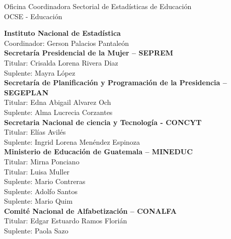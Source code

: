\cleardoublepage
$\ $
\vspace{-0.3cm}

		\begin{center}
			{\Bold \LARGE Oficina Coordinadora Sectorial de Estadísticas de Educación}\\[.3cm]
			{\Bold \LARGE OCSE - Educación}\\[1cm]
		\end{center}

\begin{multicols}{2}

\begin{center}

	

	\textbf{Instituto Nacional de Estadística}\\
	Coordinador: Gerson Palacios Pantaleón\\ [0.4cm]
	
\textbf{	Secretaría Presidencial de la Mujer – SEPREM}\\
	Titular: Crisalda Lorena Rivera Diaz \\
	Suplente: Mayra López\\ [0.4cm]
	
\textbf{	Secretaría de Planificación y Programación de la Presidencia – SEGEPLAN}\\
	Titular: Edna Abigail Alvarez Och \\
	Suplente: Alma Lucrecia Corzantes\\ [0.4cm]
	
\textbf{	Secretaria Nacional de ciencia y Tecnología  - CONCYT}\\
	Titular: Elías Avilés\\
	Suplente: Ingrid Lorena Menéndez Espinoza \\ [0.4cm]
	
\textbf{	Ministerio de Educación de Guatemala – MINEDUC}\\
	Titular: Mirna Ponciano \\
	Titular: Luisa Muller \\
	Suplente: Mario Contreras \\
	Suplente: Adolfo Santos \\
	Suplente: Mario Quim \\ [0.4cm]
	
\textbf{	Comité Nacional de Alfabetización – CONALFA}\\
	Titular: Edgar Estuardo Ramos Florián\\
	Suplente: Paola Sazo\\ [0.4cm]
	

\end{center}
\end{multicols}
